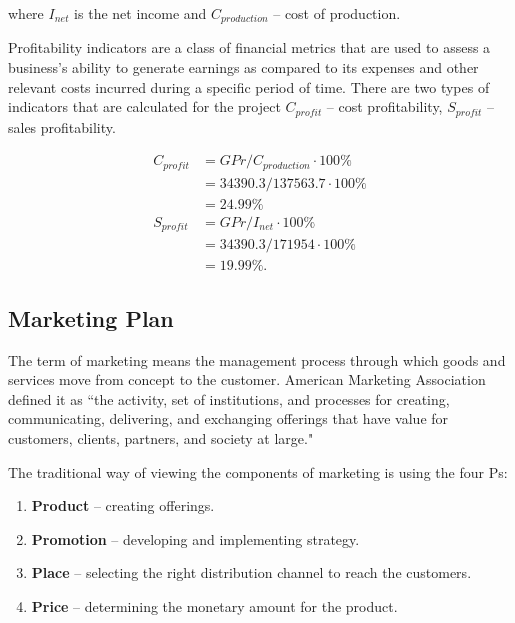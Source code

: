 \noindent
where $I_{net}$ is the net income and $C_{production}$ -- cost of production.

Profitability indicators are a class of financial metrics that are used to assess a business's ability to generate earnings as compared to its expenses and other relevant costs incurred during a specific period of time. There are two types of indicators that are calculated for the project $C_{profit}$ -- cost profitability, $S_{profit}$ -- sales profitability.

\begin{equation}
 \begin{split}
  C_{profit} &= GPr / C_{production} \cdot 100\%\\
             &= 34390.3 / 137563.7 \cdot 100\% \\
             &= 24.99 \%\\
  S_{profit} &= GPr / I_{net} \cdot 100\% \\
             &= 34390.3 / 171954 \cdot 100\% \\
             &= 19.99 \%.
 \end{split}
\end{equation}

\subsection{Marketing Plan}

The term of marketing means the management process through which goods and services move from concept to the customer. American Marketing Association defined it as ``the activity, set of institutions, and processes for creating, communicating, delivering, and exchanging offerings that have value for customers, clients, partners, and society at large." \cite{marketing} 

The traditional way of viewing the components of marketing is using the four Ps:

\begin{enumerate}

\item \textbf{Product} -- creating offerings.
\item \textbf{Promotion} -- developing and implementing strategy.
\item \textbf{Place} -- selecting the right distribution channel to reach the customers.
\item \textbf{Price} -- determining the monetary amount for the product.

\end{enumerate}

